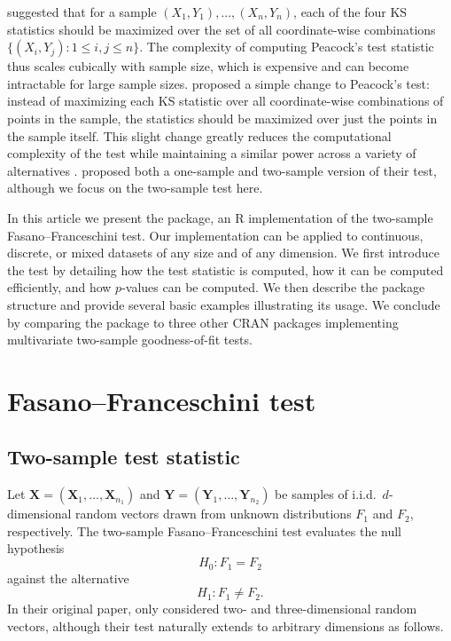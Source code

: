 \citet{peacock_1983} suggested that for a sample $(X_{1},Y_{1}),\dots,(X_{n},Y_{n})$, each of the four KS statistics should be maximized over the set of all coordinate-wise combinations $\{(X_{i},Y_{j}):1\leq i,j\leq n\}$. The complexity of computing Peacock's test statistic thus scales cubically with sample size, which is expensive and can become intractable for large sample sizes. \citet{ff1987} proposed a simple change to Peacock's test: instead of maximizing each KS statistic over all coordinate-wise combinations of points in the sample, the statistics should be maximized over just the points in the sample itself. This slight change greatly reduces the computational complexity of the test while maintaining a similar power across a variety of alternatives \citep{ff1987,lopes_2007}. \citet{ff1987} proposed both a one-sample and two-sample version of their test, although we focus on the two-sample test here.

In this article we present the  package, an R implementation of the two-sample Fasano--Franceschini test. Our implementation can be applied to continuous, discrete, or mixed datasets of any size and of any dimension. We first introduce the test by detailing how the test statistic is computed, how it can be computed efficiently, and how $p$-values can be computed. We then describe the package structure and provide several basic examples illustrating its usage. We conclude by comparing the package to three other CRAN packages implementing multivariate two-sample goodness-of-fit tests.


\section{Fasano--Franceschini test}
\subsection{Two-sample test statistic}
Let $\mathbf{X}=(\mathbf{X}_{1},\dots,\mathbf{X}_{n_{1}})$ and $\mathbf{Y}=(\mathbf{Y}_{1},\dots,\mathbf{Y}_{n_{2}})$ be samples of i.i.d.\ $d$-dimensional random vectors drawn from unknown distributions $F_{1}$ and $F_{2}$, respectively. The two-sample Fasano--Franceschini test evaluates the null hypothesis
\begin{equation*}
H_{0}:F_{1}=F_{2}
\end{equation*}
against the alternative
\begin{equation*}
H_{1}:F_{1}\neq F_{2}.
\end{equation*}
In their original paper, \citet{ff1987} only considered two- and three-dimensional random vectors, although their test naturally extends to arbitrary dimensions as follows.

